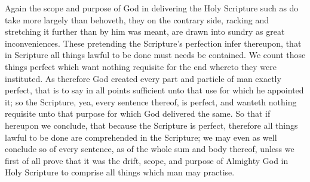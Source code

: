 Again the scope and purpose of God in delivering the Holy Scripture such as do take more largely than behoveth, they on the contrary side, racking and stretching it further than by him was meant, are drawn into sundry as great inconveniences. These pretending the Scripture’s perfection infer thereupon, that in Scripture all things lawful to be done must needs be contained. We count those things perfect which want nothing requisite for the end whereto they were instituted. As therefore God created every part and particle of man exactly perfect, that is to say in all points sufficient unto that use for which he appointed it; so the Scripture, yea, every sentence thereof, is perfect, and wanteth nothing requisite unto that purpose for which God delivered the same. So that if hereupon we conclude, that because the Scripture is perfect, therefore all things lawful to be done are comprehended in the Scripture; we may even as well conclude so of every sentence, as of the whole sum and body thereof, unless we first of all prove that it was the drift, scope, and purpose of Almighty God in Holy Scripture to comprise all things which man may practise.

